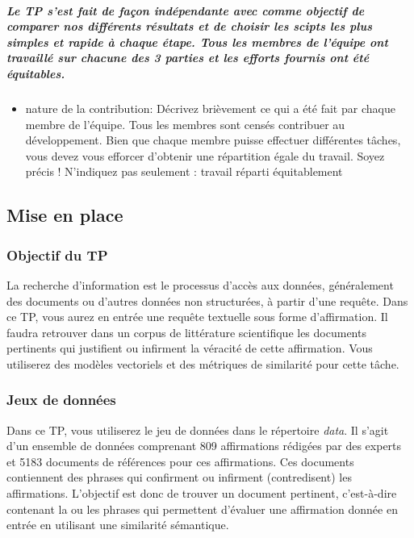 \documentclass[11pt]{article}
\providecommand{\tightlist}{%
      \setlength{\itemsep}{0pt}\setlength{\parskip}{0pt}}
\begin{document}
\subparagraph{Le TP s'est fait de façon indépendante avec comme objectif
de comparer nos différents résultats et de choisir les scipts les plus
simples et rapide à chaque étape. Tous les membres de l'équipe ont
travaillé sur chacune des 3 parties et les efforts fournis ont été
équitables.}\label{le-tp-sest-fait-de-fauxe7on-induxe9pendante-avec-comme-objectif-de-comparer-nos-diffuxe9rents-ruxe9sultats-et-de-choisir-les-scipts-les-plus-simples-et-rapide-uxe0-chaque-uxe9tape.-tous-les-membres-de-luxe9quipe-ont-travailluxe9-sur-chacune-des-3-parties-et-les-efforts-fournis-ont-uxe9tuxe9-uxe9quitables.}

\begin{itemize}
\tightlist
\item
  nature de la contribution: Décrivez brièvement ce qui a été fait par
  chaque membre de l'équipe. Tous les membres sont censés contribuer au
  développement. Bien que chaque membre puisse effectuer différentes
  tâches, vous devez vous efforcer d'obtenir une répartition égale du
  travail. Soyez précis ! N'indiquez pas seulement : travail réparti
  équitablement
\end{itemize}

    \subsection{Mise en place}\label{mise-en-place}

    \subsubsection{Objectif du TP}\label{objectif-du-tp}

La recherche d'information est le processus d'accès aux données,
généralement des documents ou d'autres données non structurées, à partir
d'une requête. Dans ce TP, vous aurez en entrée une requête textuelle
sous forme d'affirmation. Il faudra retrouver dans un corpus de
littérature scientifique les documents pertinents qui justifient ou
infirment la véracité de cette affirmation. Vous utiliserez des modèles
vectoriels et des métriques de similarité pour cette tâche.

    \subsubsection{Jeux de données}\label{jeux-de-donnuxe9es}

Dans ce TP, vous utiliserez le jeu de données dans le répertoire
\emph{data}. Il s'agit d'un ensemble de données comprenant 809
affirmations rédigées par des experts et 5183 documents de références
pour ces affirmations. Ces documents contiennent des phrases qui
confirment ou infirment (contredisent) les affirmations. L'objectif est
donc de trouver un document pertinent, c'est-à-dire contenant la ou les
phrases qui permettent d'évaluer une affirmation donnée en entrée en
utilisant une similarité sémantique.
\end{document}

